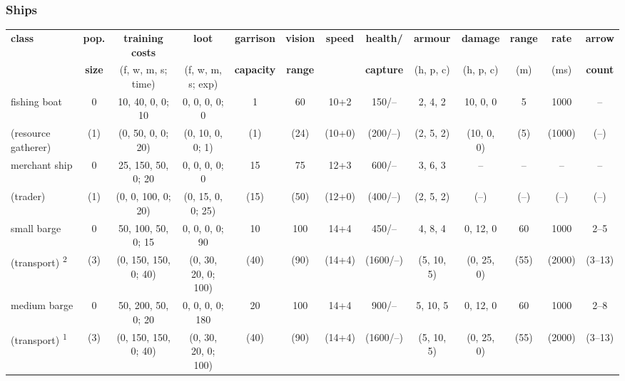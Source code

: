 \documentclass{article}
\begin{document}
\begin{landscape}
\subsubsection{Ships}
\begin{tabular}{l|ccc|ccccc|cccc}
{\bf class} & {\bf pop.} & {\bf training costs} & {\bf loot}          & {\bf garrison} & {\bf vision} & {\bf speed} & {\bf health/} & {\bf armour} & {\bf damage} & {\bf range} & {\bf rate} & {\bf arrow} \\
            & {\bf size} & {(f, w, m, s; time)} & {(f, w, m, s; exp)} & {\bf capacity} & {\bf range}  &             & {\bf capture} & {(h, p, c)}  & {(h, p, c)}  & {(m)}       & {(ms)}     & {\bf count} \\
\hline %
fishing boat          &  0  &   10,  40,   0,   0; 10  &  0,  0,  0,  0;    0  &    1  &   60  &    10+2    &   150/--  &   2,  4,  2  &   10,   0,   0  &   5  &  1000  &   --    \\ (resource gatherer)
                      & (1) &   (0,  50,   0,   0; 20) & (0, 10,  0,  0;    1) &   (1) &  (24) &   (10+0)   &  (200/--) &  (2,  5,  2) &  (10,   0,   0) &  (5) & (1000) &  (--)   \\
\hline %
merchant ship         &  0  &   25, 150,  50,   0; 20  &  0,  0,  0,  0;    0  &   15  &   75  &    12+3    &   600/--  &   3,  6,  3  &        --       &  --  &   --   &   --    \\ (trader)
                      & (1) &   (0,   0, 100,   0; 20) & (0, 15,  0,  0;   25) &  (15) &  (50) &   (12+0)   &  (400/--) &  (2,  5,  2) &       (--)      & (--) &  (--)  &  (--)   \\
\hline %
small barge           &  0  &   50, 100,  50,   0; 15  &  0,  0,  0,  0;   90  &   10  &  100  &    14+4    &   450/--  &   4,  8,  4  &    0,  12,   0  &  60  &  1000  &  2--5   \\ (transport)
\textsuperscript{2}   & (3) &   (0, 150, 150,   0; 40) & (0, 30, 20,  0;  100) &  (40) &  (90) &   (14+4)   & (1600/--) &  (5, 10,  5) &   (0,  25,   0) & (55) & (2000) & (3--13) \\ 
\hline %
medium barge          &  0  &   50, 200,  50,   0; 20  &  0,  0,  0,  0;  180  &   20  &  100  &    14+4    &   900/--  &   5, 10,  5  &    0,  12,   0  &  60  &  1000  &  2--8   \\ (transport)
\textsuperscript{1}   & (3) &   (0, 150, 150,   0; 40) & (0, 30, 20,  0;  100) &  (40) &  (90) &   (14+4)   & (1600/--) &  (5, 10,  5) &   (0,  25,   0) & (55) & (2000) & (3--13) \\ 

\end{tabular}
\end{landscape}
\end{document}
